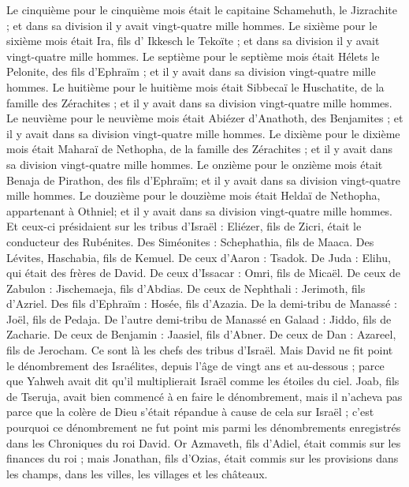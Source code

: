 \begin{multicols}{2}
Le cinquième pour le cinquième mois était le capitaine Schamehuth, le Jizrachite ; et dans sa division il y avait vingt-quatre mille hommes.
Le sixième pour le sixième mois était Ira, fils d' Ikkesch le Tekoïte ; et dans sa division il y avait vingt-quatre mille hommes.
Le septième pour le septième mois était Hélets le Pelonite, des fils d'Ephraïm ; et il y avait dans sa division vingt-quatre mille hommes.
Le huitième pour le huitième mois était Sibbecaï le Huschatite, de la famille des Zérachites ; et il y avait dans sa division vingt-quatre mille hommes.
Le neuvième pour le neuvième mois était Abiézer d'Anathoth, des Benjamites ; et il y avait dans sa division vingt-quatre mille hommes.
Le dixième pour le dixième mois était Maharaï de Nethopha, de la famille des Zérachites ; et il y avait dans sa division vingt-quatre mille hommes.
Le onzième pour le onzième mois était Benaja de Pirathon, des fils d'Ephraïm; et il y avait dans sa division vingt-quatre mille hommes.
Le douzième pour le douzième mois était Heldaï de Nethopha, appartenant à Othniel; et il y avait dans sa division vingt-quatre mille hommes.
Et ceux-ci présidaient sur les tribus d'Israël : Eliézer, fils de Zicri, était le conducteur des Rubénites. Des Siméonites : Schephathia, fils de Maaca.
Des Lévites, Haschabia, fils de Kemuel. De ceux d'Aaron : Tsadok.
De Juda : Elihu, qui était des frères de David. De ceux d'Issacar : Omri, fils de Micaël.
De ceux de Zabulon : Jischemaeja, fils d'Abdias. De ceux de Nephthali : Jerimoth, fils d'Azriel.
Des fils d'Ephraïm : Hosée, fils d'Azazia. De la demi-tribu de Manassé : Joël, fils de Pedaja.
De l'autre demi-tribu de Manassé en Galaad : Jiddo, fils de Zacharie. De ceux de Benjamin : Jaasiel, fils d'Abner.
De ceux de Dan : Azareel, fils de Jerocham. Ce sont là les chefs des tribus d'Israël.
Mais David ne fit point le dénombrement des Israélites, depuis l'âge de vingt ans et au-dessous ; parce que Yahweh avait dit qu'il multiplierait Israël comme les étoiles du ciel.
Joab, fils de Tseruja, avait bien commencé à en faire le dénombrement, mais il n'acheva pas parce que la colère de Dieu s'était répandue à cause de cela sur Israël ; c'est pourquoi ce dénombrement ne fut point mis parmi les dénombrements enregistrés dans les Chroniques du roi David.
Or Azmaveth, fils d'Adiel, était commis sur les finances du roi ; mais Jonathan, fils d'Ozias, était commis sur les provisions dans les champs, dans les villes, les villages et les châteaux.

\end{multicols}
